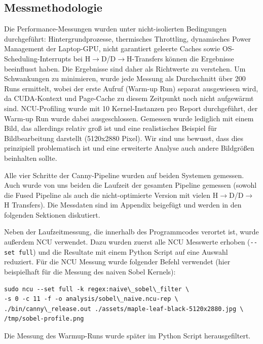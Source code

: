 \subsection{Messmethodologie}
\label{subsec:messmethodologie}

Die Performance-Messungen wurden unter nicht-isolierten Bedingungen
durchgeführt: Hintergrundprozesse, thermisches Throttling, dynamisches
Power Management der Laptop-GPU, nicht garantiert geleerte Caches sowie
OS-Scheduling-Interrupts bei H$\to$D/D$\to$H-Transfers können die
Ergebnisse beeinflusst haben. Die Ergebnisse sind daher als Richtwerte
zu verstehen. Um Schwankungen zu minimieren, wurde jede Messung als
Durchschnitt über 200 Runs ermittelt, wobei der erste Aufruf (Warm-up
Run) separat ausgewiesen wird, da CUDA-Kontext und Page-Cache zu diesem
Zeitpunkt noch nicht aufgewärmt sind. NCU-Profiling wurde mit 10
Kernel-Instanzen pro Report durchgeführt, der Warm-up Run wurde dabei
ausgeschlossen. Gemessen wurde lediglich mit einem Bild, das allerdings relativ groß ist und eine realistisches Beispiel für Bildbearbeitung darstellt (5120x2880 Pixel). Wir sind uns bewusst, dass dies prinzipiell problematisch ist und eine erweiterte Analyse auch andere Bildgrößen beinhalten sollte.

Alle vier Schritte der Canny-Pipeline wurden auf beiden Systemen gemessen. Auch wurde von uns beiden die Laufzeit der gesamten Pipeline gemessen (sowohl die Fused Pipeline als auch die nicht-optimierte Version mit vielen H$\to$D/D$\to$H Transfers). Die Messdaten sind im Appendix beigefügt und werden in den folgenden Sektionen diskutiert.

Neben der Laufzeitmessung, die innerhalb des Programmcodes verortet ist, wurde außerdem NCU verwendet. Dazu wurden zuerst alle NCU Messwerte erhoben (\texttt{-{}-set full}) und die Resultate mit einem Python Script auf eine Auswahl reduziert. Für die NCU Messung wurde folgender Befehl verwendet (hier beispielhaft für die Messung des naiven Sobel Kernels):

\begin{verbatim}
sudo ncu --set full -k regex:naive\_sobel\_filter \
-s 0 -c 11 -f -o analysis/sobel\_naive.ncu-rep \
./bin/canny\_release.out ./assets/maple-leaf-black-5120x2880.jpg \
/tmp/sobel-profile.png
\end{verbatim}

Die Messung des Warmup-Runs wurde später im Python Script herausgefiltert.